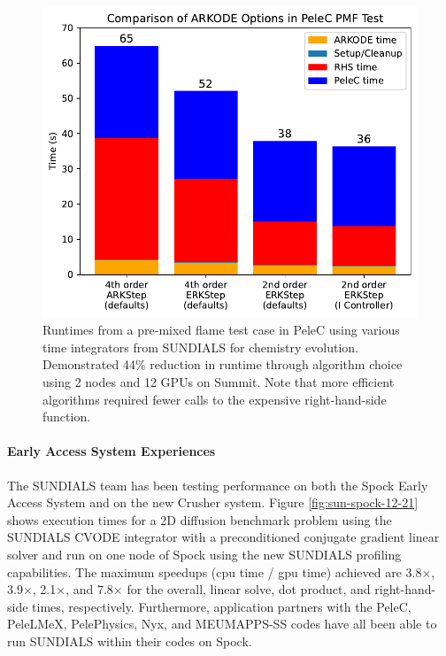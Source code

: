 \begin{figure}[htb]
  \centering
  \includegraphics[width=0.6\linewidth]{projects/2.3.3-MathLibs/2.3.3.12-SUNDIALS-hypre/PeleC_fig.pdf}
  \caption{\label{fig:sun-many-demo} Runtimes from a pre-mixed flame test case
  in PeleC using various time integrators from SUNDIALS for chemistry evolution.
  Demonstrated 44\% reduction in runtime through algorithm choice using 2 nodes
  and 12 GPUs on Summit. Note that more efficient algorithms required fewer
  calls to the expensive right-hand-side function.}
\end{figure}

\paragraph{Early Access System Experiences}
The SUNDIALS team has been testing performance on both the Spock Early Access System and on the new Crusher system.  Figure \ref{fig:sun-spock-12-21} shows execution times for a 2D diffusion benchmark problem using the SUNDIALS CVODE integrator with a preconditioned conjugate gradient linear solver and run on one node of Spock using the new SUNDIALS profiling capabilities.  The maximum speedups (cpu time / gpu time) achieved are 3.8$\times$, 3.9$\times$, 2.1$\times$, and 7.8$\times$ for the overall, linear solve, dot product, and right-hand-side times, respectively.  Furthermore, application partners with the PeleC, PeleLMeX, PelePhysics, Nyx, and MEUMAPPS-SS codes have all been able to run SUNDIALS within their codes on Spock. 


